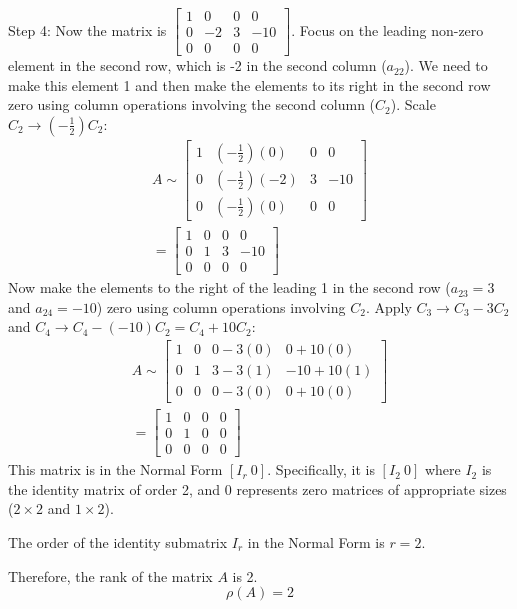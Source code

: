 \documentclass{article}
\begin{document}
Step 4: Now the matrix is $\begin{bmatrix} 1 & 0 & 0 & 0 \\ 0 & -2 & 3 & -10 \\ 0 & 0 & 0 & 0 \end{bmatrix}$. Focus on the leading non-zero element in the second row, which is -2 in the second column ($a_{22}$). We need to make this element 1 and then make the elements to its right in the second row zero using column operations involving the second column ($C_2$).
Scale $C_2 \to (-\frac{1}{2})C_2$:
\begin{align*} A \sim \begin{bmatrix} 1 & (-\frac{1}{2})(0) & 0 & 0 \\ 0 & (-\frac{1}{2})(-2) & 3 & -10 \\ 0 & (-\frac{1}{2})(0) & 0 & 0 \end{bmatrix} \\ = \begin{bmatrix} 1 & 0 & 0 & 0 \\ 0 & 1 & 3 & -10 \\ 0 & 0 & 0 & 0 \end{bmatrix}\end{align*}
Now make the elements to the right of the leading 1 in the second row ($a_{23}=3$ and $a_{24}=-10$) zero using column operations involving $C_2$.
Apply $C_3 \to C_3 - 3C_2$ and $C_4 \to C_4 - (-10)C_2 = C_4 + 10C_2$:
\begin{align*} A \sim \begin{bmatrix} 1 & 0 & 0 - 3(0) & 0 + 10(0) \\ 0 & 1 & 3 - 3(1) & -10 + 10(1) \\ 0 & 0 & 0 - 3(0) & 0 + 10(0) \end{bmatrix} \\ = \begin{bmatrix} 1 & 0 & 0 & 0 \\ 0 & 1 & 0 & 0 \\ 0 & 0 & 0 & 0 \end{bmatrix}\end{align*}
This matrix is in the Normal Form $[I_r \ 0]$. Specifically, it is $[I_2 \ 0]$ where $I_2$ is the identity matrix of order 2, and 0 represents zero matrices of appropriate sizes ($2 \times 2$ and $1 \times 2$).

The order of the identity submatrix $I_r$ in the Normal Form is $r=2$.

Therefore, the rank of the matrix $A$ is 2.
\[ \rho(A) = 2 \]
\end{document}
